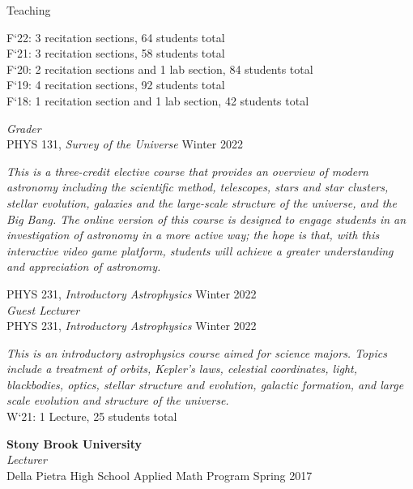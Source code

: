 \documentclass{resume} %
\newcommand{\forceindent}{\leavevmode{\parindent=1em\indent}}
\begin{document}
\begin{rSection}{Teaching}
\begin{description}[leftmargin=2em, style=nextline]
\forceindent \forceindent F`22: 3 recitation sections, 64 students total\\
\forceindent \forceindent F`21: 3 recitation sections, 58 students total\\
\forceindent \forceindent F`20: 2 recitation sections and 1 lab section, 84 students total\\
\forceindent \forceindent F`19: 4 recitation sections, 92 students total\\
\forceindent \forceindent F`18: 1 recitation section and 1 lab section, 42 students total
\end{description}
\vspace{-0.5em}
\textit{Grader} \\
\forceindent PHYS 131, \textit{Survey of the Universe} \hfill {Winter 2022}
\begin{description}[leftmargin=2em, style=nextline]
\vspace{-0.5em}
\item[~]\textit{This is a three-credit elective course that provides an overview of modern astronomy including the scientific method, telescopes, stars and star clusters, stellar evolution, galaxies and the large-scale structure of the universe, and the Big Bang. The online version of this course is designed to engage students in an investigation of astronomy in a more active way; the hope is that, with this interactive video game platform, students will achieve a greater understanding and appreciation of astronomy.}
\end{description}
\vspace{-0.5}
\forceindent PHYS 231, \textit{Introductory Astrophysics} \hfill {Winter 2022}\\
\textit{Guest Lecturer} \\
\forceindent PHYS 231, \textit{Introductory Astrophysics} \hfill {Winter 2022}
\begin{description}[leftmargin=2em, style=nextline]
\vspace{-0.5em}
\item[~]\textit{This is an introductory astrophysics course aimed for science majors. Topics include
a treatment of orbits, Kepler’s laws, celestial coordinates, light, blackbodies, optics, stellar structure and
evolution, galactic formation, and large scale evolution and structure of the universe.}\\
\forceindent \forceindent W`21: 1 Lecture, 25 students total
\end{description}
\vspace{-0.5}
\textbf{Stony Brook University} \\
\textit{Lecturer}\\
\forceindent  Della Pietra High School Applied Math Program \hfill {Spring 2017}


\end{rSection}
\end{document}
